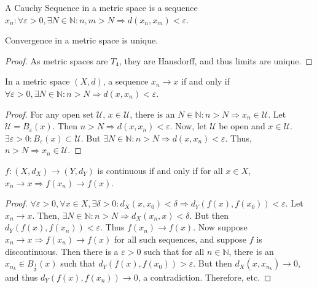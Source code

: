             \begin{definition}
                A Cauchy Sequence in a metric space is a sequence
                $x_n:\forall \varepsilon>0,\exists N\in \mathbb{N}:n,m>N\Rightarrow d(x_n,x_m)<\varepsilon$.
            \end{definition}
            \begin{theorem}
                Convergence in a metric space is unique.
            \end{theorem}
            \begin{proof}
                As metric spaces are $T_4$, they are Hausdorff, and thus
                limits are unique.
            \end{proof}
            \begin{theorem}
            In a metric space $(X,d)$, a sequence $x_n\rightarrow x$ if and only if $\forall\varepsilon>0,\exists N\in \mathbb{N}:n>N\Rightarrow d(x,x_n)<\varepsilon$.
            \end{theorem}
            \begin{proof}
            For any open set $\mathcal{U}$, $x\in \mathcal{U}$, there is an $N\in \mathbb{N}:n>N\Rightarrow x_n \in \mathcal{U}$. Let $\mathcal{U}=B_{\varepsilon}(x)$. Then $n>N\Rightarrow d(x,x_n)<\varepsilon$. Now, let $\mathcal{U}$ be open and $x\in \mathcal{U}$. $\exists\varepsilon>0:B_{\varepsilon}(x)\subset \mathcal{U}$. But $\exists N\in \mathbb{N}:n>N\Rightarrow d(x,x_n)<\varepsilon$. Thus, $n>N\Rightarrow x_n\in \mathcal{U}$.
            \end{proof}
            \begin{theorem}
            $f:(X,d_X)\rightarrow (Y,d_Y)$ is continuous if and only if for all $x\in X$, $x_n\rightarrow x \Rightarrow f(x_n)\rightarrow f(x)$.
            \end{theorem}
            \begin{proof}
            $\forall \varepsilon>0,\forall x\in X,\exists \delta>0:d_X(x,x_0)<\delta \Rightarrow d_Y(f(x),f(x_0))<\varepsilon$. Let $x_n \rightarrow x$. Then, $\exists N\in \mathbb{N}:n>N \Rightarrow d_X(x_n,x)<\delta$. But then $d_Y(f(x),f(x_n)) < \varepsilon$. Thus $f(x_n)\rightarrow f(x)$. Now suppose $x_n\rightarrow x \Rightarrow f(x_n)\rightarrow f(x)$ for all such sequences, and suppose $f$ is discontinuous. Then there is a $\varepsilon>0$ such that for all $n\in \mathbb{N}$, there is an $x_{n_k} \in B_{\frac{1}{k}}(x)$ such that $d_Y(f(x),f(x_0))>\varepsilon$. But then $d_X(x,x_{n_k})\rightarrow 0$, and thus $d_Y(f(x),f(x_n))\rightarrow 0$, a contradiction. Therefore, etc.
            \end{proof}
